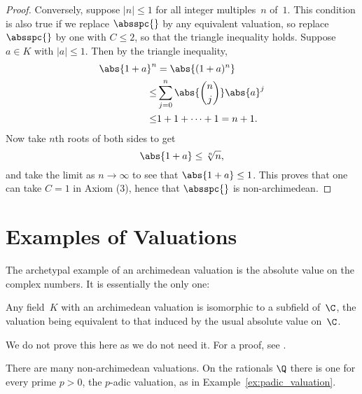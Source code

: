 \documentclass[11pt]{book}
\begin{document}
\begin{ch}
\begin{proof}
Conversely, suppose $|n|\leq 1$ for all integer multiples~$n$ of~$1$.
This condition is also true if we replace $\absspc{}$ by
any equivalent valuation, so replace $\absspc{}$ by
one with $C\leq 2$, so that the triangle inequality holds.
Suppose $a\in K$ with $|a|\leq 1$.  Then
by the triangle inequality,
\begin{align*}
  \abs{1+a}^n &= \abs{(1+a)^n} \\
     \leq& \sum_{j=0}^n \abs{\binom{n}{j}} \abs{a}^j\\
     \leq& 1 + 1 + \cdots + 1 = n+1.
\end{align*}
Now take $n$th roots of both sides to get
$$\abs{1+a} \leq \sqrt[n]{n},$$
and take the limit as $n\to \infty$ to see
that $\abs{1+a} \leq 1$.  This proves that one
can take $C=1$ in Axiom (3), hence that $\absspc{}$
is non-archimedean.
\end{proof}

\section{Examples of Valuations}
The archetypal example of an archimedean valuation is the absolute
value on the complex numbers.  It is essentially the only one:
\begin{theorem} Any field~$K$ with
an archimedean valuation is isomorphic to a subfield of~$\C$,
the valuation being equivalent to that induced by the usual
absolute value on~$\C$.
\end{theorem}
We do not prove this here as we do not need it.  For a proof,
see \cite[pg. 45, 67]{artin:ant}.

There are many non-archimedean valuations.  On the rationals $\Q$
there is one for every prime $p>0$, the $p$-adic valuation, as
in Example~\ref{ex:padic_valuation}.


\end{ch}
\end{document}
